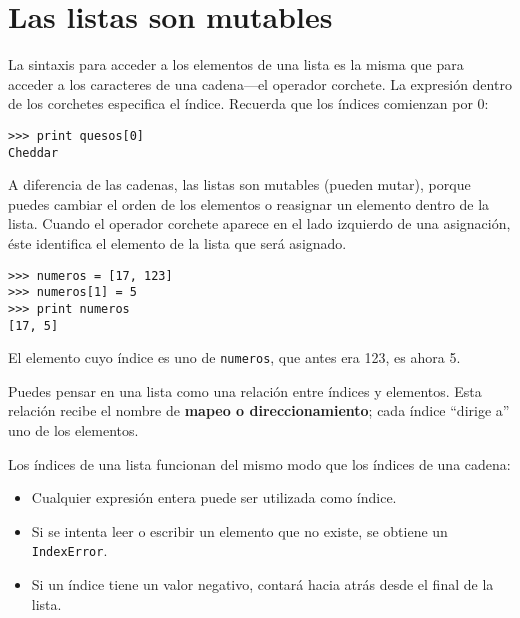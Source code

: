
\section{Las listas son mutables}


La sintaxis para acceder a los elementos de una lista es la misma que
para acceder a los caracteres de una cadena---el operador corchete. La
expresión dentro de los corchetes especifica el índice. Recuerda que los
índices comienzan por 0:

\beforeverb
\begin{verbatim}
>>> print quesos[0]
Cheddar
\end{verbatim}
\afterverb
%
A diferencia de las cadenas, las listas son mutables (pueden mutar), porque puedes cambiar el orden
de los elementos o reasignar un elemento dentro de la lista.
Cuando el operador corchete aparece en el lado izquierdo de una asignación,
éste identifica el elemento de la lista que será asignado.


\beforeverb
\begin{verbatim}
>>> numeros = [17, 123]
>>> numeros[1] = 5
>>> print numeros
[17, 5]
\end{verbatim}
\afterverb
%
El elemento cuyo índice es uno de {\tt numeros}, que
antes era 123, es ahora 5.


Puedes pensar en una lista como una relación entre índices y
elementos. Esta relación recibe el nombre de {\bf mapeo o direccionamiento}; cada índice
``dirige a'' uno de los elementos.



Los índices de una lista funcionan del mismo modo que los índices de una cadena:

\begin{itemize}

\item Cualquier expresión entera puede ser utilizada como índice.

\item Si se intenta leer o escribir un elemento que no existe,
se obtiene un {\tt IndexError}.


\item Si un índice tiene un valor negativo, contará hacia atrás desde
el final de la lista.

\end{itemize}


